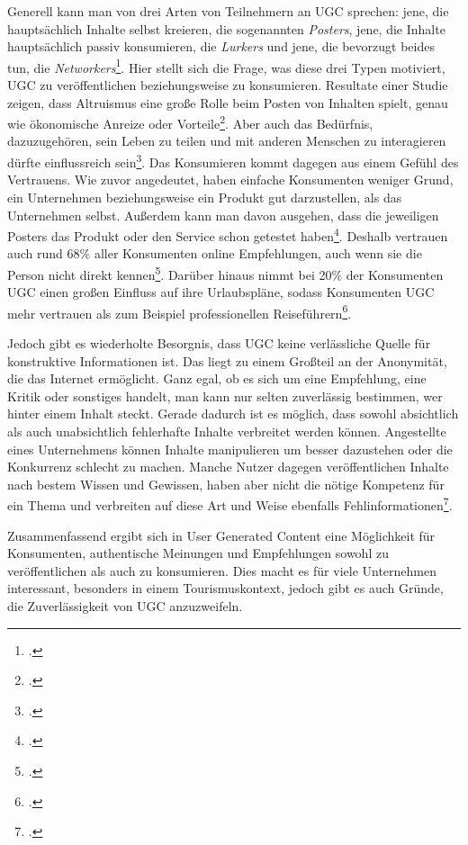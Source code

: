 Generell kann man von drei Arten von Teilnehmern an UGC sprechen: jene, die hauptsächlich Inhalte selbst kreieren, die sogenannten \textit{Posters}, jene, die Inhalte hauptsächlich passiv konsumieren, die \textit{Lurkers} und jene, die bevorzugt beides tun, die \textit{Networkers}\footcite{morrison}. Hier stellt sich die Frage, was diese drei Typen motiviert, UGC zu veröffentlichen beziehungsweise zu konsumieren. Resultate einer Studie zeigen, dass Altruismus eine große Rolle beim Posten von Inhalten spielt, genau wie ökonomische Anreize oder Vorteile\footcite{poch}. Aber auch das Bedürfnis, dazuzugehören, sein Leben zu teilen und mit anderen Menschen zu interagieren dürfte einflussreich sein\footcite{akehurst}. Das Konsumieren kommt dagegen aus einem Gefühl des Vertrauens. Wie zuvor angedeutet, haben einfache Konsumenten weniger Grund, ein Unternehmen beziehungsweise ein Produkt gut darzustellen, als das Unternehmen selbst. Außerdem kann man davon ausgehen, dass die jeweiligen Posters das Produkt oder den Service schon getestet haben\footcite{akehurst}. Deshalb vertrauen auch rund 68\% aller Konsumenten online Empfehlungen, auch wenn sie die Person nicht direkt kennen\footcite{ramirez}. Darüber hinaus nimmt bei 20\% der Konsumenten UGC einen großen Einfluss auf ihre Urlaubspläne, sodass Konsumenten UGC mehr vertrauen als zum Beispiel professionellen Reiseführern\footcite{akehurst}.

Jedoch gibt es wiederholte Besorgnis, dass UGC keine verlässliche Quelle für konstruktive Informationen ist. Das liegt zu einem Großteil an der Anonymität, die das Internet ermöglicht. Ganz egal, ob es sich um eine Empfehlung, eine Kritik oder sonstiges handelt, man kann nur selten zuverlässig bestimmen, wer hinter einem Inhalt steckt. Gerade dadurch ist es möglich, dass sowohl absichtlich als auch unabsichtlich fehlerhafte Inhalte verbreitet werden können. Angestellte eines Unternehmens können Inhalte manipulieren um besser dazustehen oder die Konkurrenz schlecht zu machen. Manche Nutzer dagegen veröffentlichen Inhalte nach bestem Wissen und Gewissen, haben aber nicht die nötige Kompetenz für ein Thema und verbreiten auf diese Art und Weise ebenfalls Fehlinformationen\footcite{chen}.

Zusammenfassend ergibt sich in User Generated Content eine Möglichkeit für Konsumenten, authentische Meinungen und Empfehlungen sowohl zu veröffentlichen als auch zu konsumieren. Dies macht es für viele Unternehmen interessant, besonders in einem Tourismuskontext, jedoch gibt es auch Gründe, die Zuverlässigkeit von UGC anzuzweifeln.


